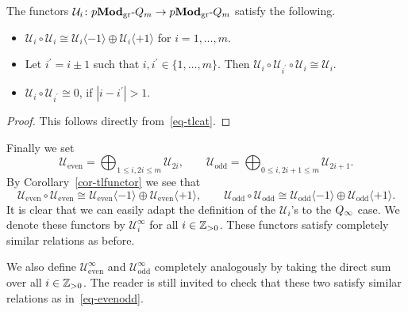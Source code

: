 \begin{cor}\label{cor-tlfunctor}
The functors $\mathcal U_i\colon p\boldsymbol{\mathrm{Mod}}_{\mathrm{gr}}\text{-}Q_m\to p\boldsymbol{\mathrm{Mod}}_{\mathrm{gr}}\text{-}Q_m$ satisfy the following.
\begin{itemize}
\item[(a)] $\mathcal U_i\circ\mathcal U_i\cong \mathcal U_i\langle -1\rangle\oplus \mathcal U_i\langle +1\rangle$ for $i=1,\dots,m$.
\item[(b)] Let $i^{\prime}=i\pm 1$ such that $i,i^{\prime}\in\{1,\dots,m\}$. Then $\mathcal U_i\circ\mathcal U_{i^{\prime}}\circ\mathcal U_i\cong\mathcal U_i$.
\item[(c)] $\mathcal U_i\circ\mathcal U_{i^{\prime}}\cong 0$, if $|i-i^{\prime}|>1$.\makeqed
\end{itemize}
\end{cor}



\begin{proof}
This follows directly from~\eqref{eq-tlcat}.
\end{proof}



Finally we set
\[
\mathcal U_{\mathrm{even}}=\!\!\bigoplus_{1\leq i, 2i\leq m}\!\!\mathcal U_{2i},\quad\quad\mathcal U_{\mathrm{odd}}=\!\!\bigoplus_{0\leq i, 2i+1\leq m}\!\!\mathcal U_{2i+1}.
\]
By Corollary~\ref{cor-tlfunctor} we see that
\begin{equation}\label{eq-evenodd}
\mathcal U_{\mathrm{even}}\circ \mathcal U_{\mathrm{even}}\cong \mathcal U_{\mathrm{even}}\langle -1\rangle\oplus \mathcal U_{\mathrm{even}}\langle +1\rangle,\quad\quad\mathcal U_{\mathrm{odd}}\circ \mathcal U_{\mathrm{odd}}\cong \mathcal U_{\mathrm{odd}}\langle -1\rangle\oplus \mathcal U_{\mathrm{odd}}\langle +1\rangle.
\end{equation}
It is clear that we can easily adapt 
the definition of the $\mathcal U_i$'s 
to the $Q_{\infty}$ case. We denote these 
functors by $\mathcal U^{\infty}_i$ 
for all $i\in\mathbb{Z}_{>0}$. These functors satisfy completely similar relations as before.



We also define $\mathcal U^{\infty}_{\mathrm{even}}$ 
and $\mathcal U^{\infty}_{\mathrm{odd}}$ completely 
analogously by taking the direct sum over all 
$i\in\mathbb{Z}_{>0}$. The reader is still invited to 
check that these two satisfy similar relations as in~\eqref{eq-evenodd}.



